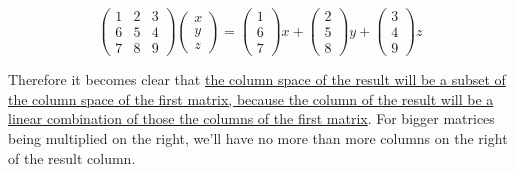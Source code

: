 \documentclass[12pt, a4paper]{article}
\begin{document}
\begin{equation}
    \begin{pmatrix}
        1 & 2 & 3 \\
        6 & 5 & 4 \\
        7 & 8 & 9 
    \end{pmatrix}
    \begin{pmatrix}
        x \\
        y \\
        z
    \end{pmatrix}
    = 
    \begin{pmatrix}
    1 \\
    6 \\
    7    
    \end{pmatrix}x + 
    \begin{pmatrix}
        2 \\
        5 \\
        8
    \end{pmatrix}y + 
    \begin{pmatrix}
        3 \\
        4 \\
        9
    \end{pmatrix}z
\end{equation}

\par Therefore it becomes clear that \uline{the column space of the result will be a subset of the column space of the first matrix, because the column of the result will be a linear combination of those the columns of the first matrix}. For bigger matrices being multiplied on the right, we'll have no more than more columns on the right of the result column. 
\end{document}
